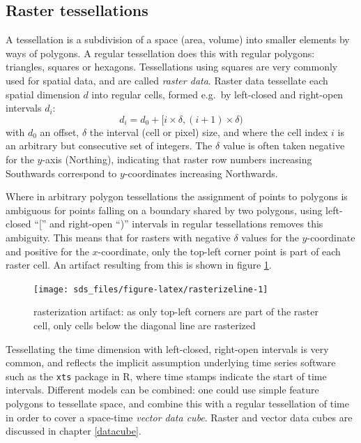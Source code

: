 \documentclass[]{book}
\begin{document}
\hypertarget{raster-tessellations}{%
\subsection{Raster tessellations}\label{raster-tessellations}}

A tessellation is a subdivision of a space (area, volume) into
smaller elements by ways of polygons. A regular tessellation
does this with regular polygons: triangles, squares or hexagons.
Tessellations using squares are very commonly used for spatial data,
and are called \emph{raster data}. Raster data
tessellate each spatial dimension \(d\) into regular cells,
formed e.g.~by left-closed and right-open intervals \(d_i\):
\begin{equation}
d_i = d_0 + [i \times \delta, (i+1) \times \delta)
\end{equation}
with \(d_0\) an offset, \(\delta\) the interval (cell or
pixel) size, and where the cell index \(i\) is an arbitrary but
consecutive set of integers. The \(\delta\) value is often taken
negative for the \(y\)-axis (Northing), indicating that raster
row numbers increasing Southwards correspond to \(y\)-coordinates
increasing Northwards.

Where in arbitrary polygon tessellations the assignment of points
to polygons is ambiguous for points falling on a boundary shared
by two polygons, using left-closed ``{[}'' and right-open ``)'' intervals
in regular tessellations removes this ambiguity. This means that for
rasters with negative \(\delta\) values for the \(y\)-coordinate and
positive for the \(x\)-coordinate, only the top-left corner point
is part of each raster cell. An artifact resulting from this is
shown in figure \ref{fig:rasterizeline}.

\begin{figure}

{\centering \texttt{[image: sds\_files/figure-latex/rasterizeline-1]} 

}

\caption{rasterization artifact: as only top-left corners are part of the raster cell, only cells below the diagonal line are rasterized}\label{fig:rasterizeline}
\end{figure}

Tessellating the time dimension with left-closed, right-open intervals
is very common, and reflects the implicit assumption underlying
time series software such as the \texttt{xts} package in R, where time
stamps indicate the start of time intervals. Different models can
be combined: one could use simple feature polygons to tessellate
space, and combine this with a regular tessellation of time in order
to cover a space-time \emph{vector data cube}. Raster and vector data
cubes are discussed in chapter \ref{datacube}.
\end{document}
